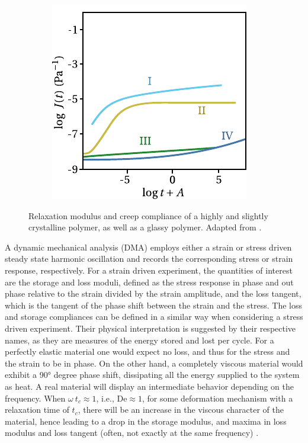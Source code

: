 \begin{figure}[hbtp]
\begin{subfigure}[b]{0.45\textwidth}
							\includegraphics[width=\textwidth]{figures/creep_compliance_scp}
							\caption{}
							\label{subfig:creep_compliance_scp}
			\end{subfigure}
	\caption{ Relaxation modulus and  creep compliance of a highly and slightly crystalline polymer, as well as a glassy polymer. Adapted from \cite{ferryViscoelasticPropertiesPolymers1980}.}
\label{fig:relax_creep_scp}
\end{figure}

A dynamic mechanical analysis (DMA) employs either a strain or stress driven steady state harmonic oscillation and records the corresponding stress or strain response, respectively.
For a strain driven experiment, the quantities of interest are the storage and loss moduli, defined as the stress response in phase and out phase relative to the strain divided by the strain amplitude, and the loss tangent, which is the tangent of the phase shift between the strain and the stress.
The loss and storage compliances can be defined in a similar way when considering a stress driven experiment.
Their physical interpretation is suggested by their respective names, as they are measures of the energy stored and lost per cycle.
For a perfectly elastic material one would expect no loss, and thus for the stress and the strain to be in phase.
On the other hand, a completely viscous material would exhibit a 90° degree phase shift, dissipating all the energy supplied to the system as heat.
A real material will display an intermediate behavior depending on the frequency.
When $\omega\ t_c \approx 1$, i.e., $\mathrm{De} \approx 1$, for some deformation mechanism with a relaxation time of $t_c$, there will be an increase in the viscous character of the material, hence leading to a drop in  the storage modulus, and maxima in loss modulus and loss tangent (often, not exactly at the same frequency) \citep{ferryViscoelasticPropertiesPolymers1980}.

